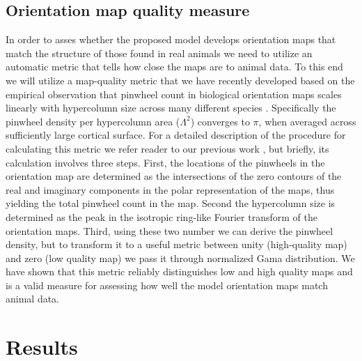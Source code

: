 \documentclass[utf8]{frontiersSCNS}
\begin{document}
\subsection{Orientation map quality measure}

In order to asses whether the proposed model develops orientation maps that match the structure of those found in real 
animals we need to utilize an automatic metric that tells how close the maps are to animal data. To this end we will 
utilize a map-quality metric that we have recently developed \citep{Stevens2013} based on the empirical observation that pinwheel count 
in biological orientation maps scales linearly with hypercolumn size across many different species \citep{Kaschube2010}.
Specifically the pinwheel density per hypercolumn area ($\Lambda^2$) converges to $\pi$, when averaged across sufficiently 
large cortical surface. For a detailed description of the procedure for calculating this metric we refer reader to 
our previous work \citep{Stevens2013}, but briefly, its calculation involves three steps. First, the locations of the pinwheels
in the orientation map are determined as the intersections of the zero contours of the real and imaginary 
components in the polar representation of the maps, thus yielding the total pinwheel count in the map. Second the 
hypercolumn size is determined as the peak in the isotropic ring-like Fourier transform of the orientation maps.
Third, using these two number we can derive the pinwheel density, but to transform it to a useful metric between 
unity (high-quality map) and zero (low quality map) we pass it through normalized Gama distribution. 
We have shown that this metric reliably distinguishes low and high quality maps \citep{Stevens2013}
and is a valid measure for assessing how well the model orientation maps match animal data.

\section{Results}
\end{document}
